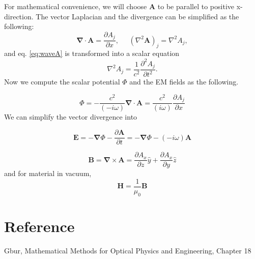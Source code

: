 \documentclass[11pt,letterpaper]{article}
\newcommand{\p}{\partial}
\newcommand{\del}{\boldsymbol\nabla}
\begin{document}
For mathematical convenience, we will choose $\mathbf{A}$ to be parallel to positive x-direction. The vector Laplacian and the divergence can be simplified as the following:
\[
\del\cdot\mathbf{A}= \frac{\p A_j}{\p x},\;\;\;\;\;
	(\nabla^2 \mathbf{A})_j= \nabla^2 A_j,
\]
and eq. \ref{eq:waveA} is transformed into a scalar equation 
\begin{equation}\label{eq:waveAj}
\nabla^2 A_j = \frac{1}{c^2} \frac{\p^2 A_j}{\p t^2}.
\end{equation}
Now we compute the scalar potential $\Phi$ and the EM fields as the following. 

\begin{equation}\label{eq:ScalarPot}
\Phi=-\frac{c^2}{(-i\omega)}\del\cdot\mathbf{A}=
\frac{c^2}{(i\omega)}\frac{\p A_j}{\p x}
\end{equation}
We can simplify the vector divergence into 

\begin{equation}\label{eq:Efield}
\mathbf{E}=-\del\Phi-\frac{\p \mathbf{A}}{\p t}=-\del\Phi-(-i\omega) \mathbf{A}
\end{equation}

\begin{equation}\label{eq:Bfield}
\mathbf{B}=\del\times\mathbf{A}= \frac{\p A_x}{\p z}\hat{y}+\frac{\p A_x}{\p y}\hat{z}
\end{equation}
and for material in vacuum, 
\[
\mathbf{H}=\frac{1}{\mu_0}\mathbf{B}
\]

\section{Reference}
Gbur, Mathematical Methods for Optical Physics and Engineering, Chapter 18


\clearpage

%
\end{document}
